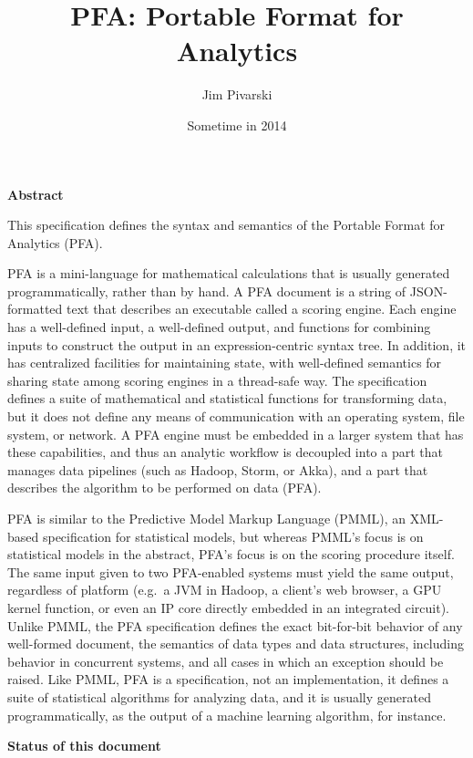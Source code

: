 \documentclass{article}
\title{PFA: Portable Format for Analytics}
\author{Jim Pivarski}
\date{Sometime in 2014}
\theoremstyle{definition}
\begin{document}
\maketitle

{\large \bf Abstract}
\vspace{0.25 cm}

This specification defines the syntax and semantics of the Portable Format for Analytics (PFA).

PFA is a mini-language for mathematical calculations that is usually generated programmatically, rather than by hand.  A PFA document is a string of JSON-formatted text that describes an executable called a scoring engine.  Each engine has a well-defined input, a well-defined output, and functions for combining inputs to construct the output in an expression-centric syntax tree.  In addition, it has centralized facilities for maintaining state, with well-defined semantics for sharing state among scoring engines in a thread-safe way.  The specification defines a suite of mathematical and statistical functions for transforming data, but it does not define any means of communication with an operating system, file system, or network.  A PFA engine must be embedded in a larger system that has these capabilities, and thus an analytic workflow is decoupled into a part that manages data pipelines (such as Hadoop, Storm, or Akka), and a part that describes the algorithm to be performed on data (PFA).  

PFA is similar to the Predictive Model Markup Language (PMML), an XML-based specification for statistical models, but whereas PMML's focus is on statistical models in the abstract, PFA's focus is on the scoring procedure itself.  The same input given to two PFA-enabled systems must yield the same output, regardless of platform (e.g.\ a JVM in Hadoop, a client's web browser, a GPU kernel function, or even an IP core directly embedded in an integrated circuit).  Unlike PMML, the PFA specification defines the exact bit-for-bit behavior of any well-formed document, the semantics of data types and data structures, including behavior in concurrent systems, and all cases in which an exception should be raised.  Like PMML, PFA is a specification, not an implementation, it defines a suite of statistical algorithms for analyzing data, and it is usually generated programmatically, as the output of a machine learning algorithm, for instance.

\vspace{0.5 cm}
{\large \bf Status of this document}
\vspace{0.25 cm}
\end{document}
